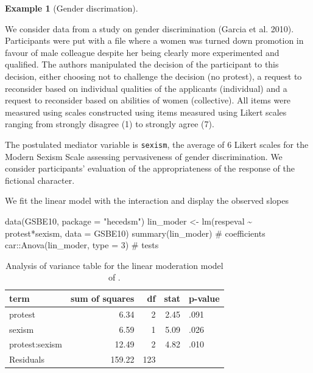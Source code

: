 \documentclass[
  11pt,
  letterpaper,
]{scrbook}
\newenvironment{Shaded}{\begin{snugshade}}{\end{snugshade}}
\newcommand{\AttributeTok}[1]{\textcolor[rgb]{0.40,0.45,0.13}{#1}}
\newcommand{\CommentTok}[1]{\textcolor[rgb]{0.37,0.37,0.37}{#1}}
\newcommand{\DecValTok}[1]{\textcolor[rgb]{0.68,0.00,0.00}{#1}}
\newcommand{\FunctionTok}[1]{\textcolor[rgb]{0.28,0.35,0.67}{#1}}
\newcommand{\NormalTok}[1]{\textcolor[rgb]{0.00,0.23,0.31}{#1}}
\newcommand{\OtherTok}[1]{\textcolor[rgb]{0.00,0.23,0.31}{#1}}
\newcommand{\SpecialCharTok}[1]{\textcolor[rgb]{0.37,0.37,0.37}{#1}}
\newcommand{\StringTok}[1]{\textcolor[rgb]{0.13,0.47,0.30}{#1}}
\theoremstyle{definition}
\newtheorem{example}{Example}[chapter]
\theoremstyle{definition}
\theoremstyle{remark}
\begin{document}
\begin{example}[Gender
discrimation]\protect\hypertarget{exm-moderation1}{}\label{exm-moderation1}

We consider data from a study on gender discrimination (Garcia et al.
2010). Participants were put with a file where a women was turned down
promotion in favour of male colleague despite her being clearly more
experimented and qualified. The authors manipulated the decision of the
participant to this decision, either choosing not to challenge the
decision (no protest), a request to reconsider based on individual
qualities of the applicants (individual) and a request to reconsider
based on abilities of women (collective). All items were measured using
scales constructed using items measured using Likert scales ranging from
strongly disagree (1) to strongly agree (7).

The postulated mediator variable is \texttt{sexism}, the average of 6
Likert scales for the Modern Sexism Scale assessing pervasiveness of
gender discrimination. We consider participants' evaluation of the
appropriateness of the response of the fictional character.

We fit the linear model with the interaction and display the observed
slopes

\begin{Shaded}
\begin{Highlighting}[]
\FunctionTok{data}\NormalTok{(GSBE10, }\AttributeTok{package =} \StringTok{"hecedsm"}\NormalTok{)}
\NormalTok{lin\_moder }\OtherTok{\textless{}{-}} \FunctionTok{lm}\NormalTok{(respeval }\SpecialCharTok{\textasciitilde{}}\NormalTok{ protest}\SpecialCharTok{*}\NormalTok{sexism,}
               \AttributeTok{data =}\NormalTok{ GSBE10)}
\FunctionTok{summary}\NormalTok{(lin\_moder) }\CommentTok{\# coefficients}
\NormalTok{car}\SpecialCharTok{::}\FunctionTok{Anova}\NormalTok{(lin\_moder, }\AttributeTok{type =} \DecValTok{3}\NormalTok{) }\CommentTok{\# tests}
\end{Highlighting}
\end{Shaded}

\begin{longtable}[]{@{}lrrrl@{}}

\caption{\label{tbl-testsmoder}Analysis of variance table for the linear
moderation model of .}

\tabularnewline

\toprule\noalign{}
term & sum of squares & df & stat & p-value \\
\midrule\noalign{}
\endhead
\bottomrule\noalign{}
\endlastfoot
protest & 6.34 & 2 & 2.45 & .091 \\
sexism & 6.59 & 1 & 5.09 & .026 \\
protest:sexism & 12.49 & 2 & 4.82 & .010 \\
Residuals & 159.22 & 123 & & \\


\end{longtable}
\end{example}
\end{document}
